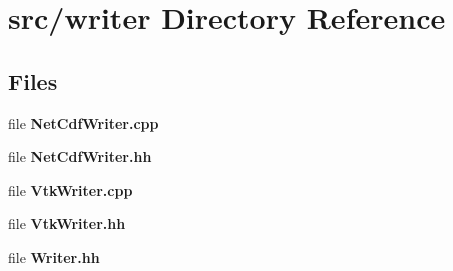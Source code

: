 \section{src/writer Directory Reference}
\label{dir_d23ba569ffb931581bcd85a3af3f3bc5}
\subsection*{Files}
\begin{DoxyCompactItemize}
\item 
file {\bf Net\-Cdf\-Writer.\-cpp}
\item 
file {\bf Net\-Cdf\-Writer.\-hh}
\item 
file {\bf Vtk\-Writer.\-cpp}
\item 
file {\bf Vtk\-Writer.\-hh}
\item 
file {\bf Writer.\-hh}
\end{DoxyCompactItemize}
